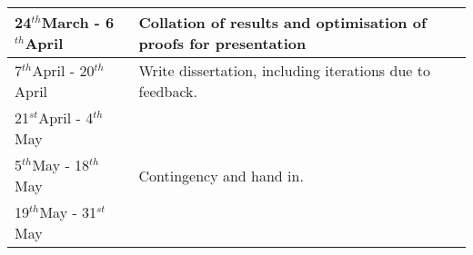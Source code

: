 \documentclass[11pt]{article}
\newcommand{\st}{$^{st}$}
\renewcommand{\th}{$^{th}$}
\begin{document}
\begin{tabular}{|p{6cm}||p{10cm}|}
	24\th March - 6\th April & Collation of results and optimisation of proofs for presentation \\\hline
	7\th April - 20\th April & Write dissertation, including iterations due to feedback. \\\cline{1-1}
	21\st April - 4\th May &\\\hline
	5\th May - 18\th May & Contingency and hand in.\\\cline{1-1}
	19\th May - 31\st May & \\
\hline
\end{tabular}

\newpage
\appendix
\end{document}
